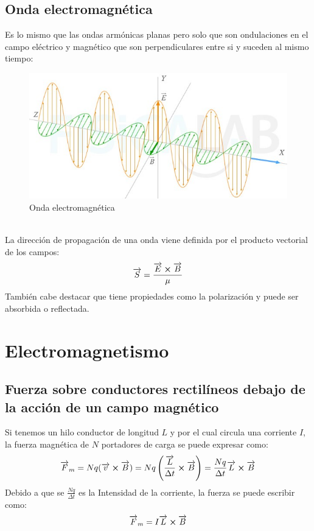 \documentclass[arial,a4paper,print]{article}
\begin{document}
\subsection{Onda electromagnética}
Es lo mismo que las ondas armónicas planas pero solo que son ondulaciones en el campo eléctrico y magnético que son perpendiculares entre si y suceden al mismo tiempo:
\begin{figure}[h]
	\centering
	\includegraphics[width=0.4\linewidth]{figures/sintesis-electromagnetica}
	\caption{Onda electromagnética}
	\label{fig:sintesis-electromagnetica}
\end{figure}
\\
La dirección de propagación de una onda viene definida por el producto vectorial de los campos:
\begin{equation*}
	\overrightarrow{S} = \frac{\overrightarrow{E}\cross\overrightarrow{B}}{\mu}
\end{equation*}
También cabe destacar que tiene propiedades como la polarización y puede ser absorbida o reflectada. 


\section{Electromagnetismo}
\subsection{Fuerza sobre conductores rectilíneos debajo de la acción de un campo magnético}
Si tenemos un hilo conductor de longitud $L$ y por el cual circula una corriente $I$, la fuerza magnética de $N$ portadores de carga se puede expresar como:
\begin{equation*}
	\overrightarrow{F}_{m} = Nq(\overrightarrow{v}\cross\overrightarrow{B}) = Nq\left(\frac{\overrightarrow{L}}{\Delta t}\cross\overrightarrow{B}\right) = \frac{Nq}{\Delta t}\overrightarrow{L}\cross\overrightarrow{B}
\end{equation*}
Debido a que se $\frac{Nq}{\Delta t}$ es la Intensidad de la corriente, la fuerza se puede escribir como:
\begin{equation*}
	\overrightarrow{F}_{m} = I\overrightarrow{L}\cross\overrightarrow{B}
\end{equation*}
\end{document}
